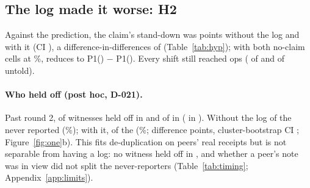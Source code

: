 \subsection{The log made it worse: H2 \wtthHaikuHTwoVerdictText}\label{sec:h2}
Against the prediction, the claim's stand-down was \wtthHaikuHTwoDeltaRZero{} points without the log and \wtthHaikuHTwoDeltaROne{} with it (CI \wtthHaikuHTwoDeltaROneCI), a difference-in-differences of \wtthHaikuHTwoDelta{} (Table~\ref{tab:hyp}); with both no-claim cells at \wtthHaikuPOneNonePct\%, \Dtwo{} reduces to P1() $-$ P1().
Every shift still reached ops (\wtthHaikuPTwoClaimK{} of \wtthHaikuPTwoClaimN{} and \wtthHaikuPTwoNoReceiptK{} of \wtthHaikuPTwoNoReceiptN{} untold).

\paragraph{Who held off (post hoc, D-021).}
Past round 2, \wtthHaikuHeldOffClaimN{} of \wtthHaikuTimingClaimN{} witnesses held off in  and \wtthHaikuHeldOffNoReceiptN{} of \wtthHaikuTimingNoReceiptN{} in  (\wtthHaikuTimingNoneRHeldOffK{} in ).
Without the log \wtthHaikuHeldOffClaimNeverK{} of the \wtthHaikuHeldOffClaimN{} never reported (\wtthHaikuHeldOffClaimNeverPct\%); with it, \wtthHaikuHeldOffNoReceiptNeverK{} of the \wtthHaikuHeldOffNoReceiptN{} (\wtthHaikuHeldOffNoReceiptNeverPct\%; difference \wtthHaikuHeldOffNeverNoReceiptMinusClaimDelta{} points, cluster-bootstrap CI \wtthHaikuHeldOffNeverNoReceiptMinusClaimCI; Figure~\ref{fig:one}b).
This fits de-duplication on peers' real receipts but is not separable from having a log: no witness held off in , and whether a peer's note was in view did not split the never-reporters (Table~\ref{tab:timing}; Appendix~\ref{app:limits}).
